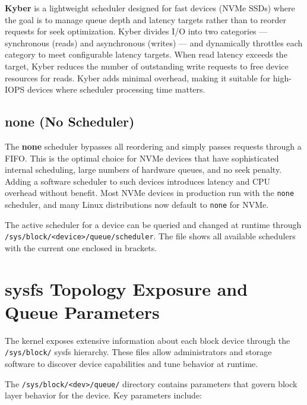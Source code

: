 \textbf{Kyber} is a lightweight scheduler designed for fast devices (NVMe SSDs) where the goal is to manage queue depth and latency targets rather than to reorder requests for seek optimization. Kyber divides I/O into two categories --- synchronous (reads) and asynchronous (writes) --- and dynamically throttles each category to meet configurable latency targets. When read latency exceeds the target, Kyber reduces the number of outstanding write requests to free device resources for reads. Kyber adds minimal overhead, making it suitable for high-IOPS devices where scheduler processing time matters.

\subsection{none (No Scheduler)}

The \textbf{none} scheduler bypasses all reordering and simply passes requests through a FIFO. This is the optimal choice for NVMe devices that have sophisticated internal scheduling, large numbers of hardware queues, and no seek penalty. Adding a software scheduler to such devices introduces latency and CPU overhead without benefit. Most NVMe devices in production run with the \texttt{none} scheduler, and many Linux distributions now default to \texttt{none} for NVMe.

The active scheduler for a device can be queried and changed at runtime through \texttt{/sys/block/<device>/queue/scheduler}. The file shows all available schedulers with the current one enclosed in brackets.

\section{sysfs Topology Exposure and Queue Parameters}
\label{sec:sysfs}

The kernel exposes extensive information about each block device through the \texttt{/sys/block/} sysfs hierarchy. These files allow administrators and storage software to discover device capabilities and tune behavior at runtime.

The \texttt{/sys/block/<dev>/queue/} directory contains parameters that govern block layer behavior for the device. Key parameters include:

